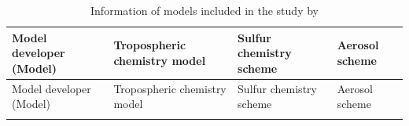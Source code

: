 \begin{small}
\begin{longtable}{>{\raggedright}p{3.25cm} >{\raggedright}p{3.25cm} >{\raggedright}p{3.5cm} >{\raggedright\arraybackslash}p{3.5cm}}
    \caption[Information of models included in the study by \citet{zhangRoleAnthropogenicAerosols2021}]{Information of models included in the study by \citet{zhangRoleAnthropogenicAerosols2021}}
    \label{tab:zhang-model}
    \\
    \toprule
     Model developer (Model) & Tropospheric chemistry model & Sulfur chemistry scheme & Aerosol scheme \\
     \midrule
     \endfirsthead

    \toprule
     Model developer (Model) & Tropospheric chemistry model & Sulfur chemistry scheme & Aerosol scheme \\
     \midrule
     \endhead
     
     \bottomrule
     \endlastfoot


\end{longtable}
\end{small}
